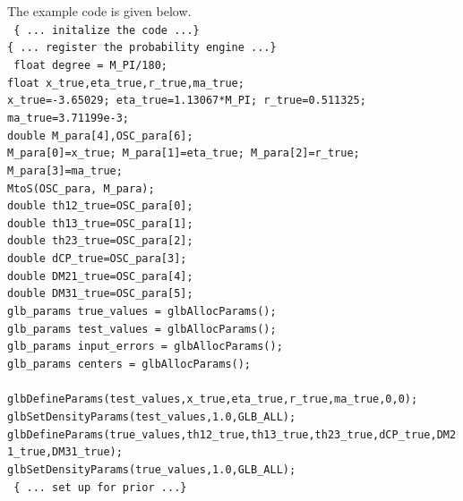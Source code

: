 \documentclass[aps,prd,nofootinbib,preprint]{revtex4}
\begin{document}
The example code is given below.\vspace{0.2cm}\\
\texttt{ \{ ...  initalize the code ...\}\\
\{ ...  register the probability engine ...\}    }\vspace{0.2cm}\\
\texttt{    
    float degree   = M\_PI/180;\\
    float x\_true,eta\_true,r\_true,ma\_true;\\
    x\_true=-3.65029; eta\_true=1.13067*M\_PI; r\_true=0.511325; ma\_true=3.71199e-3;\\
    double M\_para[4],OSC\_para[6];\\
    M\_para[0]=x\_true; M\_para[1]=eta\_true; M\_para[2]=r\_true; M\_para[3]=ma\_true;\\
    MtoS(OSC\_para, M\_para);\\
    double th12\_true=OSC\_para[0];\\
    double th13\_true=OSC\_para[1];\\
    double th23\_true=OSC\_para[2];\\
    double dCP\_true=OSC\_para[3];\\
    double DM21\_true=OSC\_para[4];\\
    double DM31\_true=OSC\_para[5];\\
    glb\_params true\_values = glbAllocParams();\\
    glb\_params test\_values = glbAllocParams();\\
    glb\_params input\_errors = glbAllocParams();\\
    glb\_params centers = glbAllocParams();\\
    \\
    glbDefineParams(test\_values,x\_true,eta\_true,r\_true,ma\_true,0,0);\\
    glbSetDensityParams(test\_values,1.0,GLB\_ALL);\\
    glbDefineParams(true\_values,th12\_true,th13\_true,th23\_true,dCP\_true,DM21\_true,DM31\_true);\\
    glbSetDensityParams(true\_values,1.0,GLB\_ALL); }\vspace{0.2cm}\\
\texttt{ \{ ...  set up for prior ...\}}\vspace{0.2cm}\\
\end{document}
